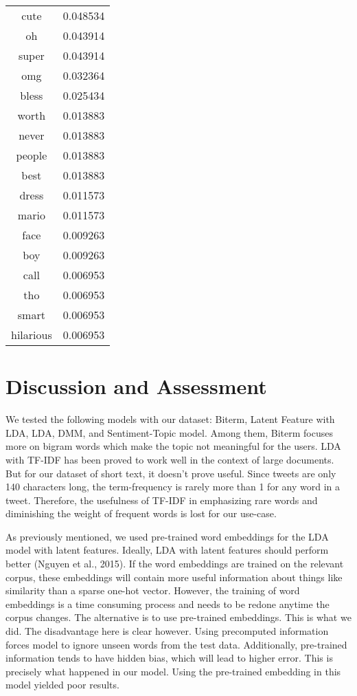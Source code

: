 \documentclass[12pt]{amsart}
\newcommand{\0}{\mat{0}}
\newcommand{\1}{\mathds{1}}
\begin{document}
\begin{table}[!h]
\begin{minipage}{.5\linewidth}
{\begin{tabular}{|c|c|}
                cute & 0.048534 \\
                oh & 0.043914 \\
                super & 0.043914 \\
                omg & 0.032364 \\
                bless & 0.025434 \\
                worth & 0.013883 \\
                never & 0.013883 \\
                people & 0.013883 \\
                best & 0.013883 \\
                dress & 0.011573 \\
                mario & 0.011573 \\
                face & 0.009263 \\
                boy & 0.009263 \\
                call & 0.006953 \\
                tho & 0.006953 \\
                smart & 0.006953 \\
                hilarious & 0.006953 \\
                \hline
        	\end{tabular}
        }
    \end{minipage} 
\end{table}

\newpage
\section{Discussion and Assessment}
We tested the following models with our dataset: Biterm, Latent Feature with LDA, LDA, DMM, and Sentiment-Topic model. Among them, Biterm focuses more on bigram words which make the topic not meaningful for the users. LDA with TF-IDF has been proved to work well in the context of large documents. But for our dataset of short text, it doesn't prove useful. Since tweets are only 140 characters long, the term-frequency is rarely more than 1 for any word in a tweet. Therefore, the usefulness of TF-IDF in emphasizing rare words and diminishing the weight of frequent words is lost for our use-case.

As previously mentioned, we used pre-trained word embeddings for the LDA model with latent features. Ideally, LDA with latent features should perform better (Nguyen et al., 2015). If the word embeddings are trained on the relevant corpus, these embeddings will contain more useful information about things like similarity than a sparse one-hot vector. However, the training of word embeddings is a time consuming process and needs to be redone anytime the corpus changes. The alternative is to use pre-trained embeddings. This is what we did. The disadvantage here is clear however. Using precomputed information forces model to ignore unseen words from the test data. Additionally, pre-trained information tends to have hidden bias, which will lead to higher error. This is precisely what happened in our model. Using the pre-trained embedding in this model yielded poor results.
\end{document}
